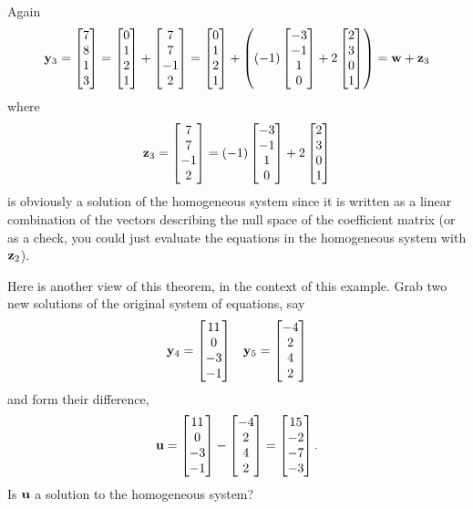 \documentclass{ximera}
\begin{document}
\begin{example}
  Again
  \[
    \mathbf{y}_3=\begin{bmatrix}7\\8\\1\\3\end{bmatrix}
    =\begin{bmatrix}0\\1\\2\\1\end{bmatrix}+\begin{bmatrix}7\\7\\-1\\2\end{bmatrix}
    =\begin{bmatrix}0\\1\\2\\1\end{bmatrix}+\left((-1)\begin{bmatrix}-3\\-1\\1\\0\end{bmatrix}+2\begin{bmatrix}2\\3\\0\\1\end{bmatrix}\right)
    =\mathbf{w}+\mathbf{z}_3
  \]
  where
  \[
    \mathbf{z}_3=\begin{bmatrix}7\\7\\-1\\2\end{bmatrix}=
    (-1)\begin{bmatrix}-3\\-1\\1\\0\end{bmatrix}+2\begin{bmatrix}2\\3\\0\\1\end{bmatrix}
  \]
  is obviously a solution of the homogeneous system since it is
  written as a linear combination of the vectors describing the null
  space of the coefficient matrix (or as a check, you could just
  evaluate the equations in the homogeneous system with $\mathbf{z}_2$).

  Here is another view of this theorem, in the context of this
  example.  Grab two new solutions of the original system of
  equations, say
  \begin{align*}
    \mathbf{y}_4=\begin{bmatrix}11\\0\\-3\\-1\end{bmatrix}&&
    \mathbf{y}_5=\begin{bmatrix}-4\\2\\4\\2\end{bmatrix}
  \end{align*}
  and form their difference,
  \[
    \mathbf{u}=\begin{bmatrix}11\\0\\-3\\-1\end{bmatrix}-\begin{bmatrix}-4\\2\\4\\2\end{bmatrix}=\begin{bmatrix}15\\-2\\-7\\-3\end{bmatrix}.
  \]
  Is $\mathbf{u}$ a solution to the homogeneous system?
  \begin{multipleChoice}
  \end{multipleChoice}


\end{example}
\end{document}
